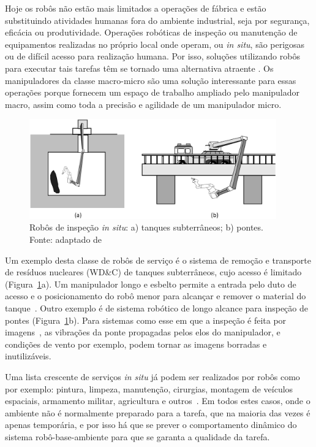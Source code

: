 Hoje os robôs não estão mais limitados a operações de fábrica e estão
substituindo atividades humanas fora do ambiente industrial, seja por segurança,
eficácia ou produtividade. Operações robóticas de inspeção ou manutenção de
equipamentos realizadas no próprio local onde operam, ou \textit{in situ}, são
perigosas ou de difícil acesso para realização humana. Por isso, soluções
utilizando robôs para executar tais tarefas têm se tornado uma alternativa
atraente . Os manipuladores da classe macro-micro são uma solução interessante
para essas operações porque fornecem um espaço de trabalho ampliado pelo
manipulador macro, assim como toda a precisão e agilidade de um manipulador
micro.

\begin{figure}[h]
	\centering 
 	\includegraphics[width=0.95\textwidth]{figs/inspection_robots}
 	\caption[Robôs de inspeção \textit{in situ}]{Robôs de inspeção \textit{in
 	situ}: a) tanques subterrâneos; b) pontes. \\ Fonte: adaptado de \cite{mavroidis1995end}}
 	\label{fig::inspection_robots}
\end{figure}

Um exemplo desta classe de robôs de serviço é o sistema de remoção e transporte
de resíduos nucleares (WD\&C) de tanques subterrâneos, cujo acesso é limitado
(Figura~\ref{fig::inspection_robots}a). Um manipulador longo e esbelto permite
a entrada pelo duto de acesso e o posicionamento do robô menor para alcançar e
remover o material do tanque~\cite{knape1990development}. Outro exemplo é de
sistema robótico de longo alcance para inspeção de pontes
(Figura~\ref{fig::inspection_robots}b). Para sistemas como esse em que a
inspeção é feita por imagens~\cite{oh2009bridge}, as vibrações da ponte
propagadas pelos elos do manipulador, e condições de vento por exemplo, podem
tornar as imagens borradas e inutilizáveis.

Uma lista crescente de serviços \textit{in situ} já podem ser realizados por
robôs como por exemplo: pintura, limpeza, manutenção, cirurgias, montagem de
veículos espaciais, armamento militar, agricultura e
outros~\cite{nof1999handbook}. Em todos estes casos, onde o ambiente não é
normalmente preparado para a tarefa, que na maioria das vezes é apenas
temporária, e por isso há que se prever o comportamento dinâmico do sistema
robô-base-ambiente para que se garanta a qualidade da tarefa.


